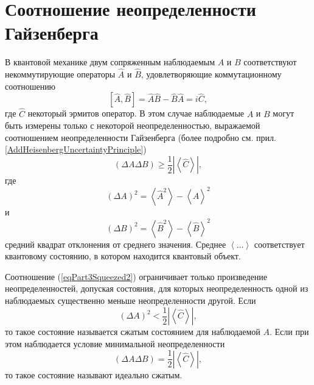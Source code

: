 \section{Соотношение неопределенности Гайзенберга}
В квантовой механике двум сопряженным наблюдаемым $A$ и $B$
соответствуют некоммутирующие операторы $\hat{A}$ и $\hat{B}$,
удовлетворяющие коммутационному соотношению
\begin{equation}
\left[
\hat{A}, \hat{B}
\right] = 
\hat{A}\hat{B} - \hat{B}\hat{A} = i \hat{C},
\nonumber
\end{equation}
где $\hat{C}$ некоторый эрмитов оператор. В этом случае наблюдаемые
$A$ и $B$ могут быть измерены только с некоторой неопределенностью,
выражаемой соотношением неопределенности Гайзенберга
(более подробно см. прил. \ref{AddHeisenbergUncertaintyPrinciple})
\begin{equation}
\left(
\Delta A \Delta B
\right) \ge \frac{1}{2} \left|\left<\hat{C}\right>\right|,
\label{eqPart3Squeezed2}
\end{equation}
где
\[
\left(\Delta A\right)^2 = \left<\hat{A}^2\right> - \left<\hat{A}\right>^2
\]
и
\[
\left(\Delta B\right)^2 = \left<\hat{B}^2\right> - \left<\hat{B}\right>^2
\]
средний квадрат отклонения от среднего значения. 
Среднее $\left<\dots\right>$ соответствует квантовому состоянию, в
котором находится квантовый объект.

Соотношение (\ref{eqPart3Squeezed2}) ограничивает только произведение
неопределенностей, допуская состояния, для которых неопределенность
одной из наблюдаемых существенно меньше неопределенности другой.
Если 
\begin{equation}
\left(\Delta A\right)^2 < \frac{1}{2} \left|\left<\hat{C}\right>\right|,
\nonumber
\end{equation}
то такое состояние называется сжатым состоянием для наблюдаемой
$A$. Если при этом наблюдается условие минимальной неопределенности
\begin{equation}
\left(
\Delta A \Delta B
\right) = \frac{1}{2} \left|\left<\hat{C}\right>\right|,
\nonumber
\end{equation}
то такое состояние называют идеально сжатым.
